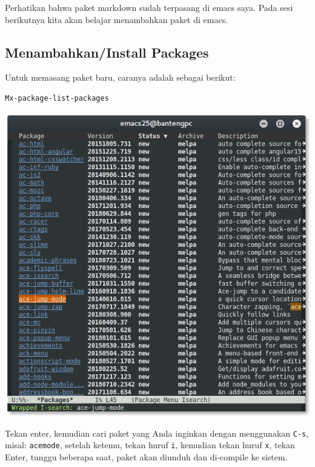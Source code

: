 \documentclass{article}
\begin{document}
\vspace{12pt}

Perhatikan bahwa paket markdown sudah terpasang di emacs saya. 
Pada sesi berikutnya kita akan belajar menambahkan paket di emacs.

\subsection{Menambahkan/Install Packages}

Untuk memasang paket baru, caranya adalah sebagai berikut:

\begin{verbatim}
Mx-package-list-packages
\end{verbatim}

\includegraphics[scale=.5]{images/emacs_install_from_repo1.png} 

Tekan enter, kemudian cari paket yang Anda inginkan dengan 
menggunakan \verb=C-s=, misal: \verb=acemode=, setelah ketemu, tekan huruf \verb=i=, kemudian tekan huruf \verb=x=,
tekan Enter, tunggu beberapa saat, paket akan diunduh dan di-compile
ke sistem.
\end{document}
